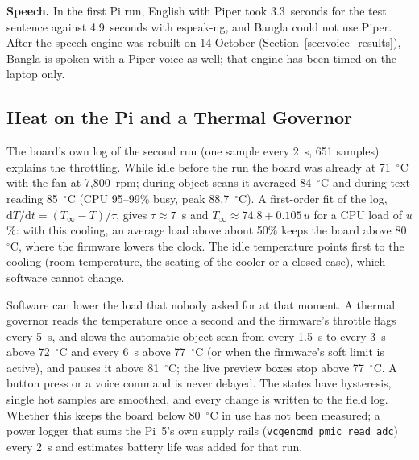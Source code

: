 \textbf{Speech.} In the first Pi run, English with Piper took 3.3~seconds for the test sentence against 4.9~seconds with espeak-ng, and Bangla could not use Piper. After the speech engine was rebuilt on 14 October (Section~\ref{sec:voice_results}), Bangla is spoken with a Piper voice as well; that engine has been timed on the laptop only.

\subsection{Heat on the Pi and a Thermal Governor}
\label{sec:thermal}
The board's own log of the second run (one sample every 2~s, 651 samples) explains the throttling. While idle before the run the board was already at 71~$^\circ$C with the fan at 7,800~rpm; during object scans it averaged 84~$^\circ$C and during text reading 85~$^\circ$C (CPU 95--99\% busy, peak 88.7~$^\circ$C). A first-order fit of the log, $\mathrm{d}T/\mathrm{d}t = (T_\infty - T)/\tau$, gives $\tau \approx 7$~s and $T_\infty \approx 74.8 + 0.105\,u$ for a CPU load of $u$\%: with this cooling, an average load above about 50\% keeps the board above 80~$^\circ$C, where the firmware lowers the clock. The idle temperature points first to the cooling (room temperature, the seating of the cooler or a closed case), which software cannot change.

Software can lower the load that nobody asked for at that moment. A thermal governor reads the temperature once a second and the firmware's throttle flags every 5~s, and slows the automatic object scan from every 1.5~s to every 3~s above 72~$^\circ$C and every 6~s above 77~$^\circ$C (or when the firmware's soft limit is active), and pauses it above 81~$^\circ$C; the live preview boxes stop above 77~$^\circ$C. A button press or a voice command is never delayed. The states have hysteresis, single hot samples are smoothed, and every change is written to the field log. Whether this keeps the board below 80~$^\circ$C in use has not been measured; a power logger that sums the Pi~5's own supply rails (\texttt{vcgencmd pmic\_read\_adc}) every 2~s and estimates battery life was added for that run.

